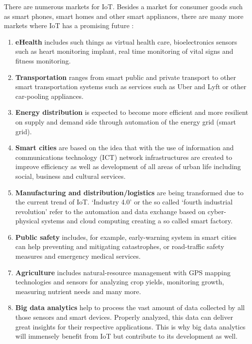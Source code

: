 		\vspace{-1em}
		There are numerous markets for IoT. Besides a market for consumer goods such as smart phones, smart homes and other smart appliances, there are many more markets where IoT has a promising future \cite{cisco}:
		\vspace{-1em}
		\begin{enumerate}
			\item \textbf{eHealth} includes such things as virtual health care, bioelectronics sensors such as heart monitoring implant, real time monitoring of vital signs and fitness monitoring.

			\item \textbf{Transportation} ranges from smart public and private transport to other smart transportation systems such as services such as Uber and Lyft or other car-pooling appliances.

			\item \textbf{Energy distribution} is expected to become more efficient and more resilient on supply and demand side through automation of the energy grid (smart grid).

			\item \textbf{Smart cities} are based on the idea that with the use of information and communications technology (ICT) network infrastructures are created to improve efficiency as well as development of all areas of urban life including social, business and cultural services.

			\item \textbf{Manufacturing and distribution/logistics} are being transformed due to the current trend of IoT. `Industry 4.0' or the so called `fourth industrial revolution' refer to the automation and data exchange based on cyber-physical systems and cloud computing creating a so called smart factory.

			\item \textbf{Public safety} includes, for example, early-warning system in smart cities can help preventing and mitigating catastrophes, or road-traffic safety measures and emergency medical services.

			\item \textbf{Agriculture} includes natural-resource management with GPS mapping technologies and sensors for analyzing crop yields, monitoring growth, measuring nutrient needs and many more. 

			\item \textbf{Big data analytics} help to process the vast amount of data collected by all those sensors and smart devices. Properly analyzed, this data can deliver great insights for their respective applications. This is why big data analytics will immensely benefit from IoT but contribute to its development as well.
		\end{enumerate}

